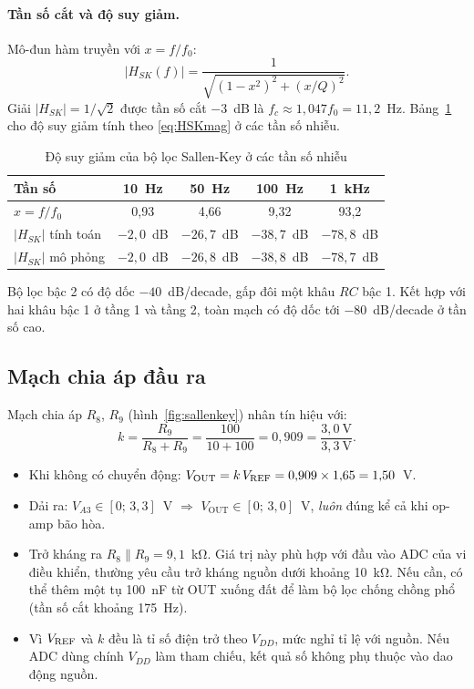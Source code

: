 \paragraph{Tần số cắt và độ suy giảm.} Mô-đun hàm truyền với $x = f/f_0$:
\begin{equation}
  |H_{SK}(f)| = \frac{1}{\sqrt{(1-x^2)^2 + (x/Q)^2}} .
  \label{eq:HSKmag}
\end{equation}
Giải $|H_{SK}| = 1/\sqrt2$ được tần số cắt $-3$~dB là $f_c \approx 1{,}047 f_0 = 11{,}2$~Hz. Bảng~\ref{tab:suygiam} cho độ suy giảm tính theo \eqref{eq:HSKmag} ở các tần số nhiễu.

\begin{table}[!htb]
\centering
\caption{Độ suy giảm của bộ lọc Sallen-Key ở các tần số nhiễu}
\label{tab:suygiam}
\small
\begin{tabular}{@{}lcccc@{}}
\toprule
\textbf{Tần số} & 10~Hz & 50~Hz & 100~Hz & 1~kHz \\ \midrule
$x = f/f_0$ & 0,93 & 4,66 & 9,32 & 93,2 \\
$|H_{SK}|$ tính toán & $-2{,}0$~dB & $-26{,}7$~dB & $-38{,}7$~dB & $-78{,}8$~dB \\
$|H_{SK}|$ mô phỏng & $-2{,}0$~dB & $-26{,}8$~dB & $-38{,}8$~dB & $-78{,}7$~dB \\
\bottomrule
\end{tabular}
\end{table}

Bộ lọc bậc 2 có độ dốc $-40$~dB/decade, gấp đôi một khâu $RC$ bậc 1. Kết hợp với hai khâu bậc 1 ở tầng 1 và tầng 2, toàn mạch có độ dốc tới $-80$~dB/decade ở tần số cao.

\subsection{Mạch chia áp đầu ra}
\label{sec:chiaap}

Mạch chia áp $R_8$, $R_9$ (hình~\ref{fig:sallenkey}) nhân tín hiệu với:
\begin{equation}
  k = \frac{R_9}{R_8+R_9} = \frac{100}{10+100} = 0{,}909 = \frac{3{,}0~\text{V}}{3{,}3~\text{V}} .
  \label{eq:k}
\end{equation}
\begin{itemize}
  \item Khi không có chuyển động: $V_\text{OUT} = k\,V_\mathrm{REF} = 0{,}909\times1{,}65 = 1{,}50$~V.
  \item Dải ra: $V_{A3} \in [0;\,3{,}3]$~V $\Rightarrow$ $V_\text{OUT} \in [0;\,3{,}0]$~V, \emph{luôn} đúng kể cả khi op-amp bão hòa.
  \item Trở kháng ra $R_8\|R_9 = 9{,}1$~kΩ. Giá trị này phù hợp với đầu vào ADC của vi điều khiển, thường yêu cầu trở kháng nguồn dưới khoảng 10~kΩ. Nếu cần, có thể thêm một tụ 100~nF từ OUT xuống đất để làm bộ lọc chống chồng phổ (tần số cắt khoảng 175~Hz).
  \item Vì $V_\mathrm{REF}$ và $k$ đều là tỉ số điện trở theo $V_{DD}$, mức nghỉ tỉ lệ với nguồn. Nếu ADC dùng chính $V_{DD}$ làm tham chiếu, kết quả số không phụ thuộc vào dao động nguồn.
\end{itemize}

